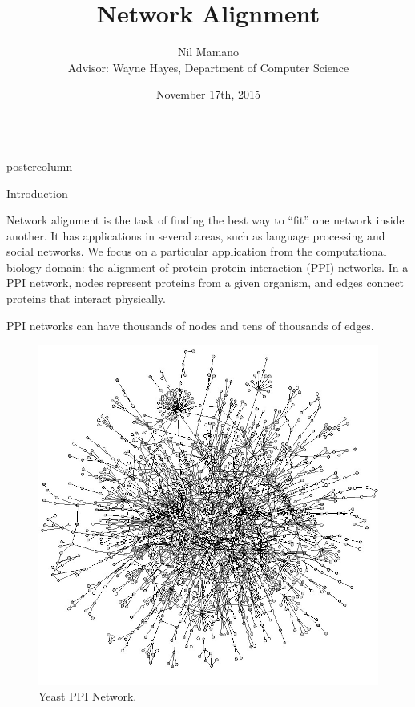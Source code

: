 \documentclass[final,hyperref={pdfpagelabels=false}]{beamer}
\title{\huge Network Alignment}
\author{\Large Nil Mamano\\Advisor: Wayne Hayes, Department of Computer Science}
\institute[University of California Irvine]{Donald Bren School, UC Irvine}
\date[November 17th, 2015]{November 17th, 2015}
\newlength{\columnheight}
\begin{document}
\begin{frame}
  \noindent\begin{columns}
    \begin{column}{.49\textwidth}
      \begin{beamercolorbox}[center,wd=\textwidth]{postercolumn}
        \begin{minipage}[T]{.95\textwidth}  %
          \parbox[t][\columnheight]{\textwidth}{ %
            \begin{block}{Introduction}

Network alignment is the task of finding the best way to ``fit'' one network inside another. It has applications in several
areas, such as language processing and social networks. We focus on a particular application from the computational biology domain:
the alignment of protein-protein interaction (PPI) networks. In a PPI network, nodes represent proteins from a given organism, and edges connect proteins that interact physically.

PPI networks can have thousands of nodes and tens of thousands of edges.
\begin{figure}
\centering
\includegraphics[width=0.68\linewidth]{../figures/proteinmap}
\caption{Yeast PPI Network.}
\label{fig:proteinmap}
\end{figure}


\end{block}}
\end{minipage}
\end{beamercolorbox}
\end{column}
\end{columns}
\end{frame}
\end{document}
